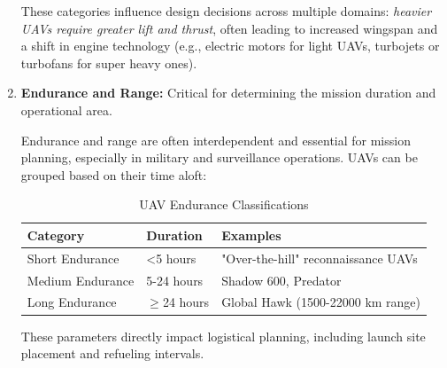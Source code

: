 \begin{enumerate}
    These categories influence design decisions across multiple domains: \textit{heavier UAVs require greater lift and thrust}, often leading to increased wingspan and a shift in engine technology (e.g., electric motors for light UAVs, turbojets or turbofans for super heavy ones).

    \item \textbf{Endurance and Range:} Critical for determining the mission duration and operational area.

    Endurance and range are often interdependent and essential for mission planning, especially in military and surveillance operations. UAVs can be grouped based on their time aloft:


    \begin{table}[h]
        \centering
        \label{tab:uav_endurance}
        \begin{tabular}{|l|l|l|}
        \hline
        \textbf{Category} & \textbf{Duration} & \textbf{Examples} \\ \hline
        Short Endurance & <5 hours & "Over-the-hill" reconnaissance UAVs \\ \hline
        Medium Endurance & 5-24 hours & Shadow 600, Predator \\ \hline
        Long Endurance & $\geq$24 hours & Global Hawk (1500-22000 km range) \\ \hline
        \end{tabular}
        \caption{UAV Endurance Classifications}
    \end{table}


    

    These parameters directly impact logistical planning, including launch site placement and refueling intervals.


\end{enumerate}
